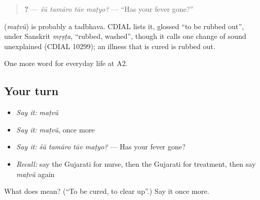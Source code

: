 \begin{quote}
\textbf{   ?} — \emph{śũ tamāro tāv maṭyo?} — \textquotedblleft{}Has your fever gone?\textquotedblright{}
\end{quote}

\begin{cousinweb}
\textbf{} (\emph{maṭvũ}) is probably a tadbhava. CDIAL lists it, glossed \textquotedblleft{}to be rubbed out\textquotedblright{}, under Sanskrit \emph{mṛṣṭa}, \textquotedblleft{}rubbed, washed\textquotedblright{}, though it calls one change of sound unexplained (CDIAL 10299); an illness that is cured is rubbed out.
\end{cousinweb}

\begin{grammarlens}[title={What you've built}]
One more word for everyday life at A2.
\end{grammarlens}

\subsection*{Your turn}
\begin{itemize}
\raggedright
  \item \emph{Say it:} \emph{maṭvũ}
  \item \emph{Say it:} \emph{maṭvũ}, once more
  \item \emph{Say it:} \emph{śũ tamāro tāv maṭyo?} — Has your fever gone?
  \item \emph{Recall:} say the Gujarati for nurse, then the Gujarati for treatment, then say \emph{maṭvũ} again
\end{itemize}

\begin{tcolorbox}[breakable,colback=teal!4,colframe=teal!35!black,title={Before you move on}]
What does  mean? (\textquotedblleft{}To be cured, to clear up\textquotedblright{}.) Say it once more.
\end{tcolorbox}
